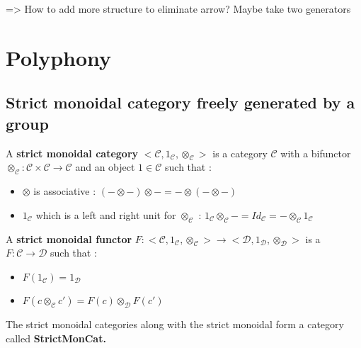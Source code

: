 \documentclass{report}
\begin{document}
=> How to add more structure to eliminate arrow? Maybe take two generators

\chapter{Polyphony}
\section{Strict monoidal category freely generated by a group}

\begin{defn}
    A \textbf{strict monoidal category}\cite{lane_1971} $\big<\mathcal{C},1_\mathcal{C},\otimes_\mathcal{C}\big>$ is a category $\mathcal{C}$ with a bifunctor $\otimes_\mathcal{C} : \mathcal{C}\times\mathcal{C} \rightarrow \mathcal{C}$ and an object $1\in\mathcal{C}$ such that :
    \begin{itemize}
        \item $\otimes$ is associative : $(-\otimes-)\otimes - = - \otimes (-\otimes-)$
        \item $1_\mathcal{C}$ which is a left and right unit for $\otimes_\mathcal{C}$ : $1_\mathcal{C}\otimes_\mathcal{C} - = Id_{\mathcal{C}} = - \otimes_\mathcal{C} 1_\mathcal{C}$
    \end{itemize}
    \label{strict-mon}
\end{defn}

\begin{defn}
    A \textbf{strict monoidal functor}
    $F : \big<\mathcal{C},1_\mathcal{C},\otimes_\mathcal{C}\big> \rightarrow \big<\mathcal{D},1_\mathcal{D},\otimes_\mathcal{D}\big>$
    is a $F : \mathcal{C} \rightarrow \mathcal{D}$ such that :
    \begin{itemize}
        \item $F(1_\mathcal{C}) = 1_\mathcal{D}$
        \item $F(c\otimes_\mathcal{C} c') = F(c)\otimes_\mathcal{D}F(c') $
    \end{itemize}
    \label{strict-mon_func}
\end{defn}

\begin{defn}[StrictMonCat]
    The strict monoidal categories along with the strict monoidal form a category called \bf StrictMonCat\cite{katsumata_2014}.
    \label{SrictMonCat}
\end{defn}
\end{document}
